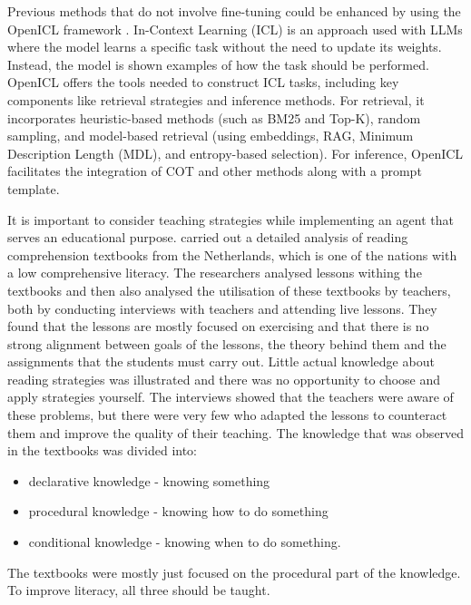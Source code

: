 \documentclass[fleqn,moreauthors,10pt]{ds_report}
\begin{document}
Previous methods that do not involve fine-tuning could be enhanced by using the OpenICL framework \cite{wu2023openicl}. In-Context Learning (ICL) is an approach used with LLMs where the model learns a specific task without the need to update its weights. Instead, the model is shown examples of how the task should be performed. OpenICL offers the tools needed to construct ICL tasks, including key components like retrieval strategies and inference methods. For retrieval, it incorporates heuristic-based methods (such as BM25 and Top-K), random sampling, and model-based retrieval (using embeddings, RAG, Minimum Description Length (MDL), and entropy-based selection). For inference, OpenICL facilitates the integration of COT and other methods along with a prompt template.

It is important to consider teaching strategies while implementing an agent that serves an educational purpose.
\cite{bogaerds2022textbooks} carried out a detailed analysis of reading comprehension textbooks from the Netherlands, which is one of the nations with a low comprehensive literacy.
The researchers analysed lessons withing the textbooks and then also analysed the utilisation of these textbooks by teachers, both by conducting interviews with teachers and attending live lessons.
They found that the lessons are mostly focused on exercising and that there is no strong alignment between goals of the lessons, the theory behind them and the assignments that the students must carry out.
Little actual knowledge about reading strategies was illustrated and there was no opportunity to choose and apply strategies yourself.
The interviews showed that the teachers were aware of these problems, but there were very few who adapted the lessons to counteract them and improve the quality of their teaching.
The knowledge that was observed in the textbooks was divided into:
\begin{itemize}
\itemsep0em
\item declarative knowledge - knowing something
\item procedural knowledge - knowing how to do something
\item conditional knowledge - knowing when to do something.
\end{itemize}
The textbooks were mostly just focused on the procedural part of the knowledge.
To improve literacy, all three should be taught.
\end{document}
